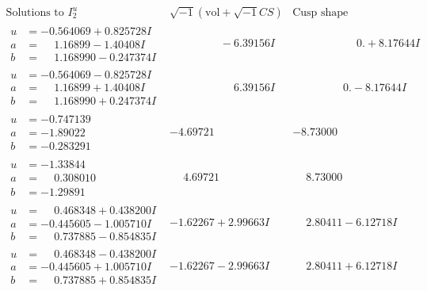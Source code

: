 \documentclass[1p]{elsarticle_modified}
\theoremstyle{definition}
\newcommand{\I}{\sqrt{-1}}
\begin{document}
$$\begin{array}{c|c|c}  
\text{Solutions to }I^u_{2}& \I (\text{vol} + \sqrt{-1}CS) & \text{Cusp shape}\\
 \hline 
\begin{aligned}
u &= -0.564069 + 0.825728 I \\
a &= \phantom{-}1.16899 - 1.40408 I \\
b &= \phantom{-}1.168990 - 0.247374 I\end{aligned}
 & \phantom{-0.000000 } -6.39156 I & \phantom{-0.000000 -}0. + 8.17644 I \\ \hline\begin{aligned}
u &= -0.564069 - 0.825728 I \\
a &= \phantom{-}1.16899 + 1.40408 I \\
b &= \phantom{-}1.168990 + 0.247374 I\end{aligned}
 & \phantom{-0.000000 -}6.39156 I & \phantom{-0.000000 } 0. - 8.17644 I \\ \hline\begin{aligned}
u &= -0.747139\phantom{ +0.000000I} \\
a &= -1.89022\phantom{ +0.000000I} \\
b &= -0.283291\phantom{ +0.000000I}\end{aligned}
 & -4.69721\phantom{ +0.000000I} & -8.73000\phantom{ +0.000000I} \\ \hline\begin{aligned}
u &= -1.33844\phantom{ +0.000000I} \\
a &= \phantom{-}0.308010\phantom{ +0.000000I} \\
b &= -1.29891\phantom{ +0.000000I}\end{aligned}
 & \phantom{-}4.69721\phantom{ +0.000000I} & \phantom{-}8.73000\phantom{ +0.000000I} \\ \hline\begin{aligned}
u &= \phantom{-}0.468348 + 0.438200 I \\
a &= -0.445605 - 1.005710 I \\
b &= \phantom{-}0.737885 - 0.854835 I\end{aligned}
 & -1.62267 + 2.99663 I & \phantom{-}2.80411 - 6.12718 I \\ \hline\begin{aligned}
u &= \phantom{-}0.468348 - 0.438200 I \\
a &= -0.445605 + 1.005710 I \\
b &= \phantom{-}0.737885 + 0.854835 I\end{aligned}
 & -1.62267 - 2.99663 I & \phantom{-}2.80411 + 6.12718 I \\ \hline\begin{aligned}

\end{aligned}
\end{array}$$
\end{document}
